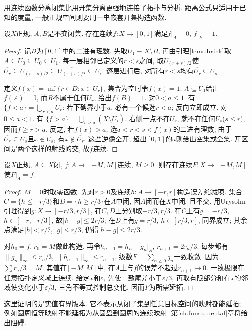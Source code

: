 用连续函数分离闭集比用开集分离更强地连接了拓扑与分析. 距离公式只适用于已知的度量, 一般正规空间则要用一串嵌套开集构造函数.
\begin{theorem}[Urysohn引理]\label{thm:urysohn}
设$X$正规, $A,B$是不交闭集. 存在连续$f:X\to[0,1]$满足$f|_A=0$, $f|_B=1$.
\end{theorem}
\begin{proof}
记$D$为$[0,1]$中的二进有理数. 先取$U_1=X\setminus B$, 再由引理\ref{lem:shrink}取$A\subseteq U_0\subseteq\overline{U_0}\subseteq U_1$. 每一层相邻已定义的$r<s$之间, 取$U_{(r+s)/2}$使$\overline{U_r}\subseteq U_{(r+s)/2}\subseteq\overline{U_{(r+s)/2}}\subseteq U_s$. 逐层进行后, 对所有$r<s$均有$\overline{U_r}\subseteq U_s$.

定义$f(x)=\inf\{r\in D:x\in U_r\}$, 集合为空时令$f(x)=1$. $A\subseteq U_0$给出$f(A)=0$, 而$B$不属于任何$U_r$, 给出$f(B)=1$. 对$0<a\le1$, 有$\{f<a\}=\bigcup_{r<a}U_r$: 若下确界小于$a$, 必有一个候选$r<a$; 反向立即成立. 对$0\le a<1$, 有
$\{f>a\}=\bigcup_{r>a}(X\setminus\overline{U_r})$.
右侧一点不在$\overline{U_r}$, 就不在任何$U_s$($s\le r$), 因而$f\ge r>a$. 反之, 若$f(x)>a$, 选$a<r<s<f(x)$的二进有理数; 由于$\overline{U_r}\subseteq U_s$且$x\notin U_s$, 有$x\notin\overline{U_r}$. 这些逆像全开, 超出$[0,1]$的$a$则给出空集或全集. 开区间是两个这样的射线的交, 故$f$连续.
\end{proof}

\begin{theorem}[有界Tietze延拓]\label{thm:tietze}
设$X$正规, $A\subseteq X$闭, $f:A\to[-M,M]$连续, $M\ge0$. 则存在连续$F:X\to[-M,M]$使$F|_A=f$.
\end{theorem}
\begin{proof}
$M=0$时取零函数. 先对$r>0$及连续$h:A\to[-r,r]$构造误差缩减项. 集合$C=\{h\le-r/3\}$和$D=\{h\ge r/3\}$在$A$中闭, 因$A$闭而在$X$中闭, 且不交. 用Urysohn引理得到$g:X\to[-r/3,r/3]$, 在$C,D$上分别取$-r/3,r/3$. 在$C$上有$g=-r/3$, $h\in[-r,-r/3]$, 故$|h-g|\le2r/3$; 在$D$上有$g=r/3$, $h\in[r/3,r]$, 同界成立; 其余点满足$|h|<r/3$, $|g|\le r/3$, 仍得$|h-g|\le2r/3$.

对$h_0=f$, $r_0=M$做此构造, 再令$h_{n+1}=h_n-g_n|_A$, $r_{n+1}=2r_n/3$. 每步都有$\lVert g_n\rVert_\infty\le r_n/3$, $\lVert h_{n+1}\rVert_\infty\le r_{n+1}$. 级数$F=\sum_{n\ge0}g_n$一致收敛, 因为$\sum r_n/3=M$. 其值在$[-M,M]$中, 在$A$上与$f$的误差不超过$r_{n+1}\to0$. 一致极限在任意拓扑定义域上连续: 给定$x$和$\varepsilon$, 先使一致尾差小于$\varepsilon/3$, 再取有限部分和在$x$的邻域使变化小于$\varepsilon/3$, 三角不等式控制总变化. 因而$F$为所需延拓.
\end{proof}
这里证明的是实值有界版本. 它不表示从闭子集到任意目标空间的映射都能延拓; 例如圆周恒等映射不能延拓为从圆盘到圆周的连续映射, 第\ref{ch:fundamental}章将给出阻碍.


